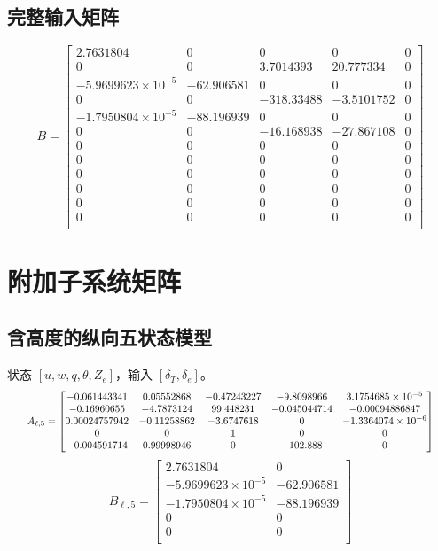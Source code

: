 \documentclass[UTF8,a4paper,11pt,fontset=windows]{ctexart}
\newcommand{\de}{\delta_e}
\newcommand{\dt}{\delta_T}
\begin{document}
\subsection{完整输入矩阵}\begin{equation}B=\begin{bmatrix}
2.7631804 & 0 & 0 & 0 & 0 \\
0 & 0 & 3.7014393 & 20.777334 & 0 \\
-5.9699623\times10^{-5} & -62.906581 & 0 & 0 & 0 \\
0 & 0 & -318.33488 & -3.5101752 & 0 \\
-1.7950804\times10^{-5} & -88.196939 & 0 & 0 & 0 \\
0 & 0 & -16.168938 & -27.867108 & 0 \\
0 & 0 & 0 & 0 & 0 \\
0 & 0 & 0 & 0 & 0 \\
0 & 0 & 0 & 0 & 0 \\
0 & 0 & 0 & 0 & 0 \\
0 & 0 & 0 & 0 & 0 \\
0 & 0 & 0 & 0 & 0 \\
\end{bmatrix}\end{equation}

\section{附加子系统矩阵}
\subsection{含高度的纵向五状态模型}
状态 $[u,w,q,\theta,Z_e]$，输入 $[\dt,\de]$。
\begin{equation}\resizebox{0.95\linewidth}{!}{$A_{\ell,5}=\begin{bmatrix}
-0.061443341 & 0.05552868 & -0.47243227 & -9.8098966 & 3.1754685\times10^{-5} \\
-0.16960655 & -4.7873124 & 99.448231 & -0.045044714 & -0.00094886847 \\
0.00024757942 & -0.11258862 & -3.6747618 & 0 & -1.3364074\times10^{-6} \\
0 & 0 & 1 & 0 & 0 \\
-0.004591714 & 0.99998946 & 0 & -102.888 & 0 \\
\end{bmatrix}$}\end{equation}
\begin{equation}B_{\ell,5}=\begin{bmatrix}
2.7631804 & 0 \\
-5.9699623\times10^{-5} & -62.906581 \\
-1.7950804\times10^{-5} & -88.196939 \\
0 & 0 \\
0 & 0 \\
\end{bmatrix}\end{equation}
\end{document}
